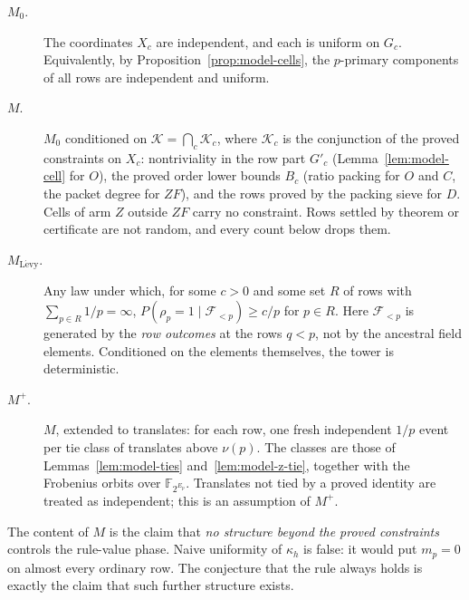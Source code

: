 \begin{definition}\label{def:model}
\leavevmode
\begin{description}
\item[$M_0$.] The coordinates $X_c$ are independent, and each is uniform on
      $G_c$.  Equivalently, by Proposition~\ref{prop:model-cells}, the
      $p$-primary components of all rows are independent and uniform.
\item[$M$.] $M_0$ conditioned on $\mathcal K=\bigcap_c\mathcal K_c$, where
      $\mathcal K_c$ is the conjunction of the proved constraints on $X_c$:
      nontriviality in the row part $G'_c$ (Lemma~\ref{lem:model-cell} for
      $O$), the proved order lower bounds $B_c$ (ratio packing for $O$ and
      $C$, the packet degree for $ZF$), and the rows proved by the packing
      sieve for $D$.  Cells of arm $Z$ outside $ZF$ carry no constraint.
      Rows settled by theorem or certificate are not random, and every count
      below drops them.
\item[$M_{\mathrm{L\acute evy}}$.] Any law under which, for some $c>0$ and some
      set $R$ of rows with $\sum_{p\in R}1/p=\infty$,
      $P(\rho_p=1\mid\mathcal F_{<p})\geq c/p$ for $p\in R$.  Here
      $\mathcal F_{<p}$ is generated by the \emph{row outcomes} at the rows
      $q<p$, not by the ancestral field elements.  Conditioned on the
      elements themselves, the tower is deterministic.
\item[$M^+$.] $M$, extended to translates: for each row, one fresh
      independent $1/p$ event per tie class of translates above $\nu(p)$.
      The classes are those of Lemmas~\ref{lem:model-ties}
      and~\ref{lem:model-z-tie}, together with the Frobenius orbits
      over $\mathbb F_{2^{E_p}}$.  Translates not tied by a proved identity
      are treated as independent; this is an assumption of $M^+$.
\end{description}
\end{definition}

The content of $M$ is the claim that \emph{no structure beyond the proved
constraints} controls the rule-value phase.  Naive uniformity of $\kappa_h$
is false: it would put $m_p=0$ on almost every ordinary row.  The
conjecture that the rule always holds is exactly the claim that such further
structure exists.

